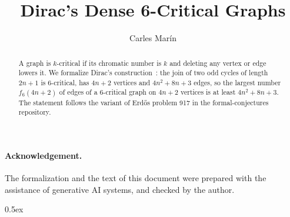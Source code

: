 \documentclass[10pt,a4paper]{article}
\begin{document}
\title{Dirac's Dense 6-Critical Graphs}
\author{Carles Mar\'in}
\maketitle

\begin{abstract}
A graph is $k$-critical if its chromatic number is $k$ and deleting any vertex or edge lowers it. We formalize Dirac's construction~\cite{Dirac1952}: the join of two odd cycles of length $2n+1$ is $6$-critical, has $4n+2$ vertices and $4n^2+8n+3$ edges, so the largest number $f_6(4n+2)$ of edges of a $6$-critical graph on $4n+2$ vertices is at least $4n^2+8n+3$. The statement follows the variant of Erd\H{o}s problem 917 in the formal-conjectures repository.
\end{abstract}

\paragraph{Acknowledgement.} The formalization and the text of this document were prepared with the
assistance of generative AI systems, and checked by the author.

\tableofcontents

\parindent 0pt\parskip 0.5ex





\end{document}
